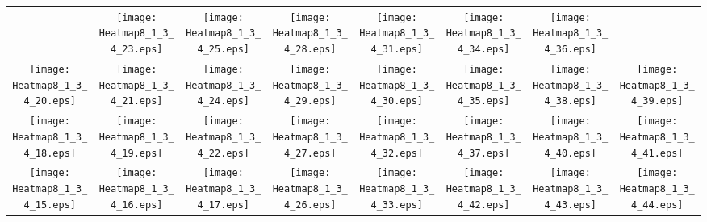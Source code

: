 \documentclass{standalone}
\begin{document}
\renewcommand{\arraystretch}{0}
\setlength{\tabcolsep}{0pt}
\begin{tabular}{ *8{c} }
 & \texttt{[image: Heatmap8\_1\_3\_4\_23.eps]} & \texttt{[image: Heatmap8\_1\_3\_4\_25.eps]} & \texttt{[image: Heatmap8\_1\_3\_4\_28.eps]} & \texttt{[image: Heatmap8\_1\_3\_4\_31.eps]} & \texttt{[image: Heatmap8\_1\_3\_4\_34.eps]} & \texttt{[image: Heatmap8\_1\_3\_4\_36.eps]} &  \\
\texttt{[image: Heatmap8\_1\_3\_4\_20.eps]} & \texttt{[image: Heatmap8\_1\_3\_4\_21.eps]} & \texttt{[image: Heatmap8\_1\_3\_4\_24.eps]} & \texttt{[image: Heatmap8\_1\_3\_4\_29.eps]} & \texttt{[image: Heatmap8\_1\_3\_4\_30.eps]} & \texttt{[image: Heatmap8\_1\_3\_4\_35.eps]} & \texttt{[image: Heatmap8\_1\_3\_4\_38.eps]} & \texttt{[image: Heatmap8\_1\_3\_4\_39.eps]} \\
\texttt{[image: Heatmap8\_1\_3\_4\_18.eps]} & \texttt{[image: Heatmap8\_1\_3\_4\_19.eps]} & \texttt{[image: Heatmap8\_1\_3\_4\_22.eps]} & \texttt{[image: Heatmap8\_1\_3\_4\_27.eps]} & \texttt{[image: Heatmap8\_1\_3\_4\_32.eps]} & \texttt{[image: Heatmap8\_1\_3\_4\_37.eps]} & \texttt{[image: Heatmap8\_1\_3\_4\_40.eps]} & \texttt{[image: Heatmap8\_1\_3\_4\_41.eps]} \\
\texttt{[image: Heatmap8\_1\_3\_4\_15.eps]} & \texttt{[image: Heatmap8\_1\_3\_4\_16.eps]} & \texttt{[image: Heatmap8\_1\_3\_4\_17.eps]} & \texttt{[image: Heatmap8\_1\_3\_4\_26.eps]} & \texttt{[image: Heatmap8\_1\_3\_4\_33.eps]} & \texttt{[image: Heatmap8\_1\_3\_4\_42.eps]} & \texttt{[image: Heatmap8\_1\_3\_4\_43.eps]} & \texttt{[image: Heatmap8\_1\_3\_4\_44.eps]} \\

\end{tabular}
\end{document}
